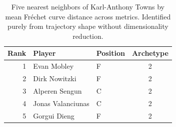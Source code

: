 \begin{table}[htbp]
  \centering\small
  \begin{tabular}{rllc}
    \toprule
    Rank & Player & Position & Archetype \\
    \midrule
    1 & Evan Mobley & F & 2 \\
    2 & Dirk Nowitzki & F & 2 \\
    3 & Alperen Sengun & C & 2 \\
    4 & Jonas Valanciunas & C & 2 \\
    5 & Gorgui Dieng & F & 2 \\
    \bottomrule
  \end{tabular}
  \caption{Five nearest neighbors of Karl-Anthony Towns by mean Fr\'{e}chet curve distance across metrics. Identified purely from trajectory shape without dimensionality reduction.}
  \label{tab:Karl_Anthony_Towns_frechet_curve_neighbors}
\end{table}

